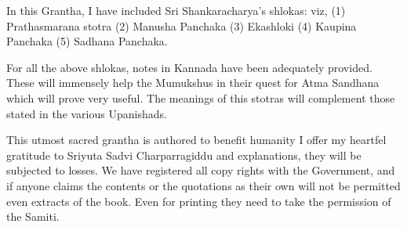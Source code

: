 \vskip 2pt

In this Grantha, I have included Sri Shankaracharya's shlokas: viz, (1) Prathasmarana stotra (2) Manusha Panchaka (3) Ekashloki (4) Kaupina Panchaka (5) Sadhana Panchaka.

\vskip 2pt

For all the above shlokas, notes in Kannada have been adequately provided. These will immensely help the Mumukshus in their quest for Atma Sandhana which will prove very useful. The meanings of this stotras will complement those stated in the various Upanishads.

\vskip 2pt

This utmost sacred grantha is authored to benefit humanity I offer my heartfel gratitude to Sriyuta Sadvi Charparragiddu and explanations, they will be subjected to losses. We have registered all copy rights with the Government, and if anyone claims the contents or the quotations as their own will not be permitted even extracts of the book. Even for printing they need to take the permission of the Samiti.

\chapter*{}

\begin{verse}
\end{verse}

\begin{verse}
\end{verse}

\begin{verse}
\end{verse}

\begin{verse}
\end{verse}

\begin{verse}
\end{verse}

